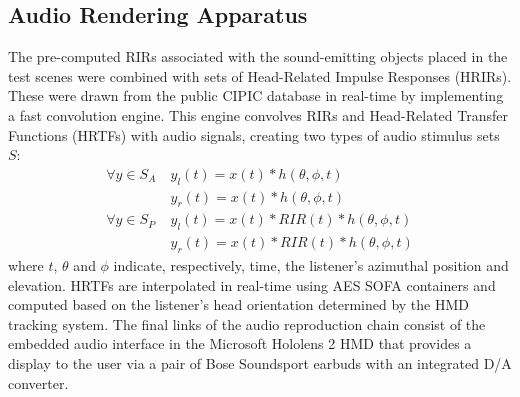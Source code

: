 \subsection{Audio Rendering Apparatus}
\label{sec:audio-apparatus}
The pre-computed RIRs associated with the sound-emitting objects placed in the test scenes were combined with sets of Head-Related Impulse Responses (HRIRs). These were drawn from the public CIPIC database in real-time by implementing a fast convolution engine. This engine convolves RIRs and Head-Related Transfer Functions (HRTFs) with audio signals, creating two types of audio stimulus sets $S$: 
\begin{align}
     \forall y \in S_{A}\ & y_l(t) = x(t) * h(\theta, \phi, t)\\
     & y_r(t) = x(t) * h(\theta, \phi, t) \\
     \forall y \in S_{P}\ & y_l(t) = x(t) * RIR(t) * h(\theta, \phi, t) \\
     & y_r(t) = x(t) * RIR(t) * h(\theta, \phi, t)
\end{align}
where $t$, $\theta$ and $\phi$ indicate, respectively, time, the listener's azimuthal position and elevation. HRTFs are interpolated in real-time using AES SOFA containers \cite{hoene2017mysofa} and computed based on the listener's head orientation determined by the HMD tracking system. The final links of the audio reproduction chain consist of the embedded audio interface in the Microsoft Hololens 2 HMD that provides a display to the user via a pair of Bose Soundsport earbuds with an integrated D/A converter.\par
